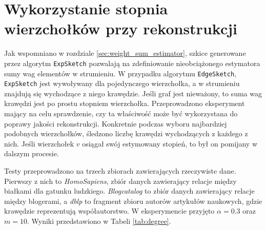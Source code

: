\section{Wykorzystanie stopnia wierzchołków przy rekonstrukcji}
    Jak wspomniano w rozdziale \ref{sec:weight_sum_estimator}, szkice generowane przez algorytm \texttt{ExpSketch} pozwalają na zdefiniowanie nieobciążonego estymatora sumy wag elementów w strumieniu. W przypadku algorytmu \texttt{EdgeSketch}, \texttt{ExpSketch} jest wywoływany dla pojedynczego wierzchołka, a w strumieniu znajdują się wychodzące z niego krawędzie. Jeśli graf jest nieważony, to suma wag krawędzi jest po prostu stopniem wierzchołka. 
    Przeprowadzono eksperyment mający na celu sprawdzenie, czy ta właściwość może być wykorzystana do poprawy jakości rekonstrukcji. Konkretnie podczas wyboru najbardziej podobnych wierzchołków, śledzono liczbę krawędzi wychodzących z każdego z nich. Jeśli wierzchołek $v$ osiągał swój estymowany stopień, to był on pomijany w dalszym procesie.  
    
    Testy przeprowadzono na trzech zbiorach zawierających rzeczywiste dane. Pierwszy z nich to \textit{HomoSapiens}, zbiór danych zawierający relacje między białkami dla gatunku ludzkiego. \textit{Blogcatalog} to zbiór danych zawierający relacje między blogerami, a \textit{dblp} to fragment zbioru autorów artykułów naukowych, gdzie krawędzie reprezentują współautorstwo. W eksperymencie przyjęto $\alpha = 0.3$ oraz $m = 10$. Wyniki przedstawiono w Tabeli \ref{tab:degree}.


